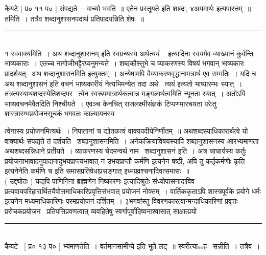 \documentclass[11pt, openany]{book}
\begin{document}
\begin{multicols}{2}
कैयटे [ प्र० ११ प० ] संपद्यते$=$वाच्यो भवति~॥ एतेन {\qt प्रस्तूयते इति शाब्दः, ४अयमार्थः} इत्यपास्तम्~॥ तमिति~। तत्रैव शब्दानुशासनपदार्थ प्रतिपादयन्निति शेषः~॥\\

\noindent
\rule{1\linewidth}{0.5pt}\\

१ स्ववाक्यमिति~। {\qt अथ शब्दानुशासनम्} इति स्वग्रन्थस्य {\qt अथेत्ययं \textendash\ } इत्यादिना स्वयमेव व्याख्यानं कुर्वन्ति भाष्यकाराः~। एतच्च नागोजीभट्टैरप्यनुमन्यते~। शब्दकौस्तुभे च {\qt व्याकरणस्य विषयं भगवान् भाष्यकारः प्रादर्शयत् \textendash\ अथ शब्दानुशासनमिति} इत्युक्तम्~। अन्येषामपि वैय्याकरणवृद्धानामत्रार्थ एव सम्मतिः~। यदि च {\qt अथ शब्दानुशासनं} इति वचनं भाष्यकारीयं नेत्यभिमन्येत तदा {\qt अथे \textendash\ त्ययं} इत्यतो भाष्यारम्भः स्यात्~। तत्रत्यस्याथशब्दस्येतिशब्दपर \textendash\ त्वेन स्वरूपमात्रार्थकत्वान्न मङ्गलार्थत्वमिति न्यूनता स्यात्~। अतोऽपि भाष्यवचनमेवैतदिति निश्चीयते~। एवञ्च केनचित् राजलक्ष्मीसंज्ञकं टिप्पणमारचयता परेःतु शास्त्रारम्भप्रयोजनसूचकं भगवतः काल्यायनस्य

\columnbreak

त्वेनास्य प्रयोजनमित्यर्थः~। निपातानां च द्योतकत्वं वाक्यपदीयेनिर्णीतम्~॥ अथशब्दस्याधिकारार्थत्वे यो वाक्यार्थः संपद्यते तं दर्शयति \textendash\ शब्दानुशासनमिति~। अनेकक्रियाविषयस्यापि शब्दानुशासनस्य आरभ्यमाणता {\qt अथ}शब्दसन्निधाने प्रतीयते~। व्याकरणस्य चेदमन्वर्थ नाम \textendash\ {\qt शब्दानुशासनं} इति~। अत्र चाचार्यस्य कर्तुः प्रयोजनाभावादनुपादानादुभयप्राप्त्यभावात् न {\qt उभयप्राप्तौ कर्मणि} इत्यनेन षष्ठी, अपि तु {\qt कर्तृकर्मणोः कृति} इत्यनेनेति {\qt कर्मणि च} इति समासप्रतिषेधाप्रसङ्गात् इध्मप्रव्रश्चनादिवत्समासः~॥\\

( उद्द्योतः ) यद्यपि पाणिनिना {\qt ब्राह्मणेन निष्कारणः} इत्यादिश्रुतेः संध्योपासनादाविव प्रत्यवायपरिहारार्थितयैवोत्तमाधिकारिप्रवृत्तिसंभवात् प्रयोजनं नोक्तम्~। वार्तिककृताऽपि {\qt शास्त्रपूर्वके प्रयोगे धर्मः} इत्यनेन मध्यमाधिकारिणः परमप्रयोजनं दर्शितम्~। ३भगवांस्तु विवरणकारत्वान्मन्दाधिकारिणां प्रवृत्तः प्ररोचकप्रयोजन \textendash\ प्रतिपत्तिप्रवणत्वात् व्यवहितेषु स्वर्गापूर्वादिष्वनाश्वासात् साक्षात्प्रयो \textendash\ \\

\noindent
\rule{1\linewidth}{0.5pt}\\

कैयटे \textendash\ [ प्र० १३ प० ] भ्यमाणतेति~। {\qt वर्तमानसामीप्ये} इति भूते लट्~॥ स्वरीत्याssह \textendash\ सन्नीति~। तत्रैव~।\\


\end{multicols}
\end{document}
